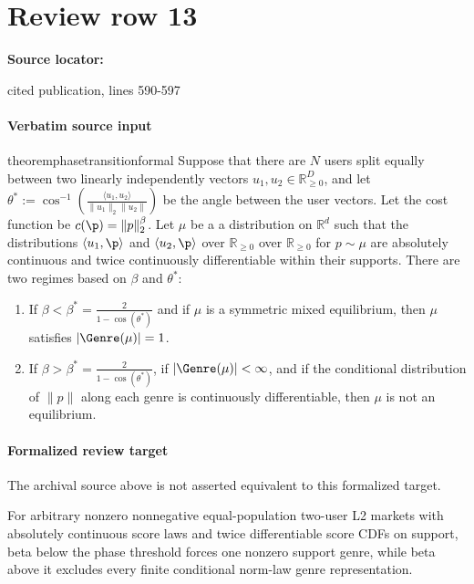 \documentclass[10pt]{article}
\begin{document}
\section*{Review row 13}
\textbf{Source locator:} {\footnotesize\raggedright cited publication, lines 590-\allowbreak{}597\par}
\paragraph{Verbatim source input}
\begin{ReviewVerbatim}
\begin{restatable}{theorem}{phasetransitionformal}
\label{thm:phasetransitionformal}
Suppose that there are $N$ users split equally between two linearly independently vectors $u_1, u_2 \in \mathbb{R}_{\ge 0}^D$, and let $\theta^* := \cos^{-1}\left( \frac{\langle u_1, u_2\rangle}{\|u_1\|_2 \|u_2\|} \right)$ be the angle between the user vectors. Let the cost function be $c(\p) = \|p\|_2^{\beta}$. Let $\mu$ be a a distribution on $\mathbb{R}^d$ such that the distributions $\langle u_1, \p\rangle$ and $\langle u_2, \p\rangle$ over $\mathbb{R}_{\ge 0}$ over $\mathbb{R}_{\ge 0}$ for $p \sim \mu$ are absolutely continuous and twice continuously differentiable within their supports. There are two regimes based on $\beta$ and $\theta^*$:
\begin{enumerate}
    \item If $\beta < \beta^* = \frac{2}{1 - \cos(\theta^*)}$ and if $\mu$ is a symmetric mixed equilibrium, then $\mu$ satisfies $|\Genre(\mu)| = 1$.
    \item If $\beta > \beta^* = \frac{2}{1 - \cos(\theta^*)}$, if $|\Genre(\mu)| < \infty$, and if the conditional distribution of $\|p\|$ along each genre is continuously differentiable, then $\mu$ is not an equilibrium.
\end{enumerate}
\end{restatable}
\end{ReviewVerbatim}


\paragraph{Formalized review target}
The archival source above is not asserted equivalent to this formalized target.
\begin{ReviewVerbatim}
For arbitrary nonzero nonnegative equal-population two-user L2 markets with absolutely continuous score laws and twice differentiable score CDFs on support, beta below the phase threshold forces one nonzero support genre, while beta above it excludes every finite conditional norm-law genre representation.
\end{ReviewVerbatim}
\end{document}
